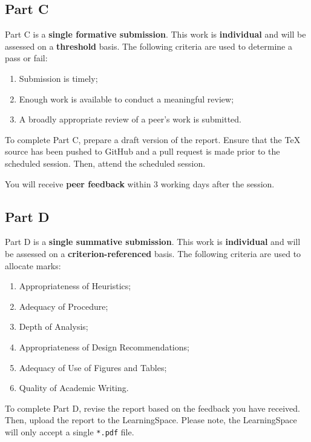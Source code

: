 \documentclass{../fal_assignment}
\begin{document}
\subsection*{Part C}

Part C is a \textbf{single formative submission}. This work is \textbf{individual} and will be assessed on a \textbf{threshold} basis. The following criteria are used to determine a pass or fail:

\begin{enumerate}[label=(\alph*)]
	\item Submission is timely;
	\item Enough work is available to conduct a meaningful review;
	\item A broadly appropriate review of a peer's work is submitted.
\end{enumerate}

To complete Part C, prepare a draft version of the report. Ensure that the TeX source has been pushed to GitHub and a pull request is made prior to the scheduled session. Then, attend the scheduled session.

You will receive \textbf{peer feedback} within 3 working days after the session.

\subsection*{Part D}

Part D is a \textbf{single summative submission}. This work is \textbf{individual} and will be assessed on a \textbf{criterion-referenced} basis. The following criteria are used to allocate marks:

\begin{enumerate}[label=(\alph*)]
	\item Appropriateness of Heuristics;
	\item Adequacy of Procedure;
	\item Depth of Analysis;
	\item Appropriateness of Design Recommendations;
	\item Adequacy of Use of Figures and Tables;
	\item Quality of Academic Writing.
\end{enumerate}

To complete Part D, revise the report based on the feedback you have received. Then, upload the report to the LearningSpace. Please note, the LearningSpace will only accept a single \texttt{*.pdf} file.
\end{document}
